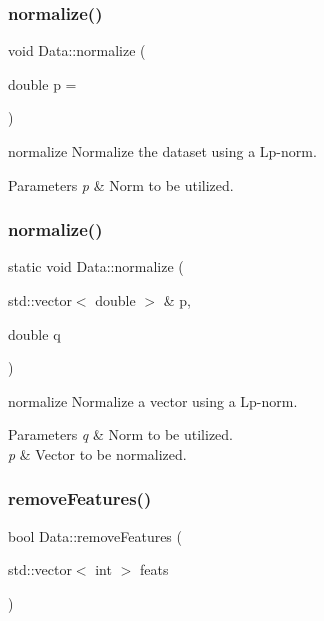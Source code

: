 \subsubsection{\texorpdfstring{normalize()}{normalize()}\hspace{0.1cm}{\footnotesize\ttfamily [1/2]}}
{\footnotesize\ttfamily void Data\+::normalize (\begin{DoxyParamCaption}\item[{double}]{p = {} }\end{DoxyParamCaption})}



normalize Normalize the dataset using a Lp-\/norm. 


\begin{DoxyParams}{Parameters}
{\em p} & Norm to be utilized. \\
\hline
\end{DoxyParams}
\mbox{\label{class_data_acd8fd65a56a3d097d1bc19fb8249ee20}} 
\subsubsection{\texorpdfstring{normalize()}{normalize()}\hspace{0.1cm}{\footnotesize\ttfamily [2/2]}}
{\footnotesize\ttfamily static void Data\+::normalize (\begin{DoxyParamCaption}\item[{std\+::vector$<$ double $>$ \&}]{p,  }\item[{double}]{q }\end{DoxyParamCaption})\hspace{0.3cm}{\ttfamily [static]}}



normalize Normalize a vector using a Lp-\/norm. 


\begin{DoxyParams}{Parameters}
{\em q} & Norm to be utilized. \\
\hline
{\em p} & Vector to be normalized. \\
\hline
\end{DoxyParams}
\mbox{\label{class_data_a0e0136f31687452ff10b489f8804ceb8}} 
\subsubsection{\texorpdfstring{remove\+Features()}{removeFeatures()}}
{\footnotesize\ttfamily bool Data\+::remove\+Features (\begin{DoxyParamCaption}\item[{std\+::vector$<$ int $>$}]{feats }\end{DoxyParamCaption})}



